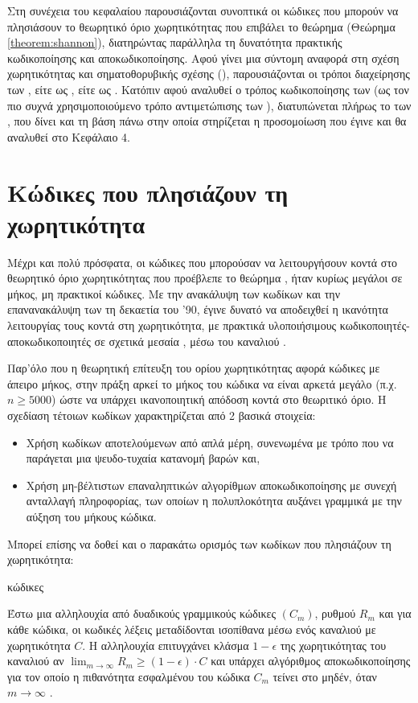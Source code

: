 Στη συνέχεια του κεφαλαίου παρουσιάζονται συνοπτικά οι κώδικες που μπορούν να πλησιάσουν το θεωρητικό όριο χωρητικότητας που επιβάλει το θεώρημα  (Θεώρημα \ref{theorem:shannon}), διατηρώντας παράλληλα τη δυνατότητα πρακτικής κωδικοποίησης και αποκωδικοποίησης. Αφού γίνει μια σύντομη αναφορά στη σχέση χωρητικότητας και σηματοθορυβικής σχέσης (), παρουσιάζονται οι τρόποι διαχείρησης των , είτε ως , είτε ως . Κατόπιν αφού αναλυθεί ο τρόπος κωδικοποίησης των  (ως τον πιο συχνά χρησιμοποιούμενο τρόπο αντιμετώπισης των ), διατυπώνεται πλήρως το  των , που δίνει και τη βάση πάνω στην οποία στηρίζεται η προσομοίωση που έγινε και θα αναλυθεί στο Κεφάλαιο 4.

\section{Κώδικες που πλησιάζουν τη χωρητικότητα}

Μέχρι και πολύ πρόσφατα, οι κώδικες που μπορούσαν να λειτουργήσουν κοντά στο θεωρητικό όριο χωρητικότητας που προέβλεπε το θεώρημα , ήταν κυρίως μεγάλοι σε μήκος, μη πρακτικοί κώδικες. Με την ανακάλυψη των  κωδίκων και την επανανακάλυψη των  τη δεκαετία του '90, έγινε δυνατό να αποδειχθεί η ικανότητα λειτουργίας τους κοντά στη χωρητικότητα, με πρακτικά υλοποιήσιμους κωδικοποιητές-αποκωδικοποιητές σε σχετικά μεσαία , μέσω του καναλιού . 

Παρ'όλο που η θεωρητική επίτευξη του ορίου χωρητικότητας αφορά κώδικες με άπειρο μήκος, στην πράξη αρκεί το μήκος του κώδικα να είναι αρκετά μεγάλο (π.χ. $n\geq5000$) ώστε να υπάρχει ικανοποιητική απόδοση κοντά στο θεωριτικό όριο. Η σχεδίαση τέτοιων κωδίκων χαρακτηρίζεται από 2 βασικά στοιχεία:
\begin{itemize}
\item Χρήση κωδίκων αποτελούμενων από απλά μέρη, συνενωμένα με τρόπο που να παράγεται μια ψευδο-τυχαία κατανομή βαρών και,
\item Χρήση μη-βέλτιστων επαναληπτικών αλγορίθμων αποκωδικοποίησης με συνεχή ανταλλαγή  πληροφορίας, των οποίων η πολυπλοκότητα αυξάνει γραμμικά με την αύξηση του μήκους κώδικα.
\end{itemize}

Μπορεί επίσης να δοθεί και ο παρακάτω ορισμός των κωδίκων που πλησιάζουν τη χωρητικότητα:
\begin{definition} κώδικες

Έστω μια αλληλουχία από δυαδικούς γραμμικούς κώδικες $\left( C_m \right)$, ρυθμού $R_m$ και για κάθε κώδικα, οι κωδικές λέξεις μεταδίδονται ισοπίθανα μέσω ενός καναλιού με χωρητικότητα $C$. Η αλληλουχία επιτυγχάνει κλάσμα $1-\epsilon$ της χωρητικότητας του καναλιού αν $\lim_{m\to \infty}R_m\geq\left(1-\epsilon\right)\cdot C$ και υπάρχει αλγόριθμος αποκωδικοποίησης για τον οποίο η πιθανότητα εσφαλμένου  του κώδικα $C_m$ τείνει στο μηδέν, όταν $m\to \infty$ \cite{pfister2005capacity}.
\label{def:capacity approaching codes}
\end{definition}

